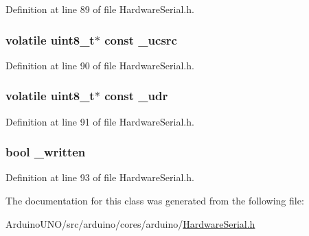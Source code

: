 Definition at line 89 of file Hardware\+Serial.\+h.

\hypertarget{class_hardware_serial_a3599c284453c515776147539d753d1bf}{}
\subsubsection[{\+\_\+ucsrc}]{\setlength{\rightskip}{0pt plus 5cm}volatile uint8\+\_\+t$\ast$ const \+\_\+ucsrc\hspace{0.3cm}{\ttfamily [protected]}}\label{class_hardware_serial_a3599c284453c515776147539d753d1bf}


Definition at line 90 of file Hardware\+Serial.\+h.

\hypertarget{class_hardware_serial_a9123daf6c7d2bc8c3997d73f7b30bece}{}
\subsubsection[{\+\_\+udr}]{\setlength{\rightskip}{0pt plus 5cm}volatile uint8\+\_\+t$\ast$ const \+\_\+udr\hspace{0.3cm}{\ttfamily [protected]}}\label{class_hardware_serial_a9123daf6c7d2bc8c3997d73f7b30bece}


Definition at line 91 of file Hardware\+Serial.\+h.

\hypertarget{class_hardware_serial_a491255f295202ef6556a978224fdc71e}{}
\subsubsection[{\+\_\+written}]{\setlength{\rightskip}{0pt plus 5cm}bool \+\_\+written\hspace{0.3cm}{\ttfamily [protected]}}\label{class_hardware_serial_a491255f295202ef6556a978224fdc71e}


Definition at line 93 of file Hardware\+Serial.\+h.



The documentation for this class was generated from the following file\+:\begin{DoxyCompactItemize}
\item 
Arduino\+U\+N\+O/src/arduino/cores/arduino/\hyperlink{_hardware_serial_8h}{Hardware\+Serial.\+h}\end{DoxyCompactItemize}
